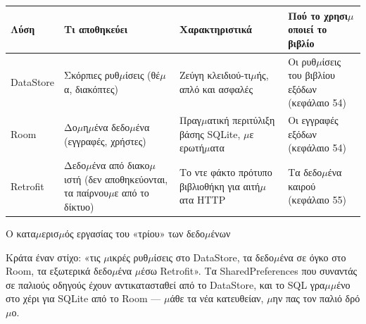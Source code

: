 


\begin{center}
\begin{tabularx}{\linewidth}{|X|X|X|X|}
\hline
\textbf{Λύση} & \textbf{Τι αποθηκεύει} & \textbf{Χαρακτηριστικά} & \textbf{Πού το χρησι$\mu$οποιεί το βιβλίο} \tabularnewline
\hline
DataStore & Σκόρπιες ρυθ$\mu$ίσεις (θέ$\mu$α, διακόπτες) & Ζεύγη κλειδιού-τι$\mu$ής, απλό και ασφαλές & Οι ρυθ$\mu$ίσεις του βιβλίου εξόδων (κεφάλαιο 54) \tabularnewline
Room & Δο$\mu$η$\mu$ένα δεδο$\mu$ένα (εγγραφές, χρήστες) & Πραγ$\mu$ατική περιτύλιξη βάσης SQLite, $\mu$ε ερωτή$\mu$ατα & Οι εγγραφές εξόδων (κεφάλαιο 54) \tabularnewline
Retrofit & Δεδο$\mu$ένα από διακο$\mu$ιστή (δεν αποθηκεύονται, τα παίρνου$\mu$ε από το δίκτυο) & Το ντε φάκτο πρότυπο βιβλιοθήκη για αιτή$\mu$ατα HTTP & Τα δεδο$\mu$ένα καιρού (κεφάλαιο 55) \tabularnewline
\hline
\end{tabularx}
\end{center}

\begin{center}\small\color{gray}Ο κατα$\mu$ερισ$\mu$ός εργασίας του «τρίου» των δεδο$\mu$ένων\end{center}

Κράτα έναν στίχο: «τις $\mu$ικρές ρυθ$\mu$ίσεις στο DataStore, τα δεδο$\mu$ένα σε όγκο στο Room, τα εξωτερικά δεδο$\mu$ένα $\mu$έσω Retrofit». Τα SharedPreferences που συναντάς σε παλιούς οδηγούς έχουν αντικατασταθεί από το DataStore, και το SQL γρα$\mu$$\mu$ένο στο χέρι για SQLite από το Room — $\mu$άθε τα νέα κατευθείαν, $\mu$ην πας τον παλιό δρό$\mu$ο.



